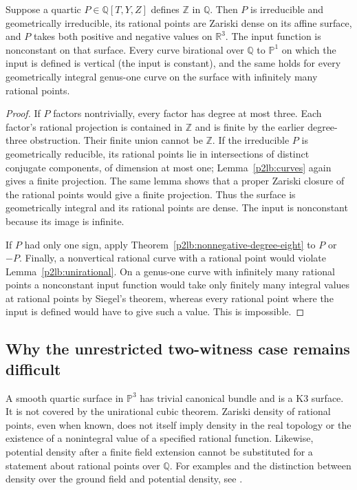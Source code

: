 \begin{proposition}\label{p2lb:quartic-surface-necessary}
Suppose a quartic $P\in\mathbb Q[T,Y,Z]$ defines $\mathbb Z$ in
$\mathbb Q$.  Then $P$ is irreducible and geometrically irreducible,
its rational points are Zariski dense on its affine surface, and
$P$ takes both positive and negative values on $\mathbb R^3$.
The input function is nonconstant on that surface.  Every curve
birational over $\mathbb Q$ to $\mathbb P^1$ on which the input is defined is vertical
(the input is constant), and the same holds for every geometrically
integral genus-one curve on the surface with infinitely many rational
points.
\end{proposition}
\begin{proof}
If $P$ factors nontrivially, every factor has degree at most three.
Each factor's rational projection is contained in $\mathbb Z$ and
is finite by the earlier degree-three obstruction.  Their finite
union cannot be $\mathbb Z$.  If the irreducible $P$ is geometrically
reducible, its rational points lie in intersections of distinct
conjugate components, of dimension at most one; Lemma~\ref{p2lb:curves}
again gives a finite projection.  The same lemma shows that a proper
Zariski closure of the rational points would give a finite projection.
Thus the surface is geometrically integral and its rational points
are dense.  The input is nonconstant because its image is infinite.

If $P$ had only one sign, apply
Theorem~\ref{p2lb:nonnegative-degree-eight} to $P$ or $-P$.
Finally, a nonvertical rational curve with a rational point would
violate Lemma~\ref{p2lb:unirational}.  On a genus-one curve with
infinitely many rational points a nonconstant input function would
take only finitely many integral values at rational points by
Siegel's theorem, whereas every rational point where the input is
defined would have to give such a value.  This is impossible.
\end{proof}

\subsection{Why the unrestricted two-witness case remains difficult}

A smooth quartic surface in $\mathbb P^3$ has trivial canonical
bundle and is a K3 surface.  It is not covered by the unirational
cubic theorem.  Zariski density of rational points, even when known,
does not itself imply density in the real topology or the existence
of a nonintegral value of a specified rational function.  Likewise,
potential density after a finite field extension cannot be substituted
for a statement about rational points over $\mathbb Q$.
For examples and the distinction between density over the ground field
and potential density, see \cite{p2lbHarrisTschinkel2000}.

